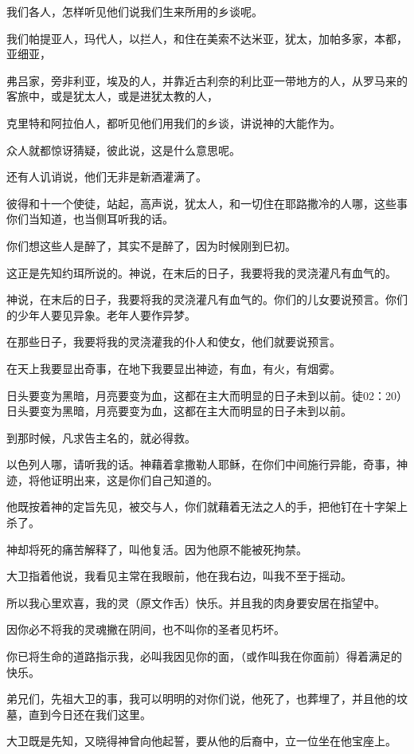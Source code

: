 \documentclass[12pt,oneside]{book}
\begin{document}
我们各人，怎样听见他们说我们生来所用的乡谈呢。

我们帕提亚人，玛代人，以拦人，和住在美索不达米亚，犹太，加帕多家，本都，亚细亚，

弗吕家，旁非利亚，埃及的人，并靠近古利奈的利比亚一带地方的人，从罗马来的客旅中，或是犹太人，或是进犹太教的人，

克里特和阿拉伯人，都听见他们用我们的乡谈，讲说神的大能作为。

众人就都惊讶猜疑，彼此说，这是什么意思呢。

还有人讥诮说，他们无非是新酒灌满了。

彼得和十一个使徒，站起，高声说，犹太人，和一切住在耶路撒冷的人哪，这些事你们当知道，也当侧耳听我的话。

你们想这些人是醉了，其实不是醉了，因为时候刚到巳初。

这正是先知约珥所说的。神说，在末后的日子，我要将我的灵浇灌凡有血气的。

神说，在末后的日子，我要将我的灵浇灌凡有血气的。你们的儿女要说预言。你们的少年人要见异象。老年人要作异梦。

在那些日子，我要将我的灵浇灌我的仆人和使女，他们就要说预言。

在天上我要显出奇事，在地下我要显出神迹，有血，有火，有烟雾。

日头要变为黑暗，月亮要变为血，这都在主大而明显的日子未到以前。徒02：20）日头要变为黑暗，月亮要变为血，这都在主大而明显的日子未到以前。

到那时候，凡求告主名的，就必得救。

以色列人哪，请听我的话。神藉着拿撒勒人耶稣，在你们中间施行异能，奇事，神迹，将他证明出来，这是你们自己知道的。

他既按着神的定旨先见，被交与人，你们就藉着无法之人的手，把他钉在十字架上杀了。

神却将死的痛苦解释了，叫他复活。因为他原不能被死拘禁。

大卫指着他说，我看见主常在我眼前，他在我右边，叫我不至于摇动。

所以我心里欢喜，我的灵（原文作舌）快乐。并且我的肉身要安居在指望中。

因你必不将我的灵魂撇在阴间，也不叫你的圣者见朽坏。

你已将生命的道路指示我，必叫我因见你的面，（或作叫我在你面前）得着满足的快乐。

弟兄们，先祖大卫的事，我可以明明的对你们说，他死了，也葬埋了，并且他的坟墓，直到今日还在我们这里。

大卫既是先知，又晓得神曾向他起誓，要从他的后裔中，立一位坐在他宝座上。
\end{document}
